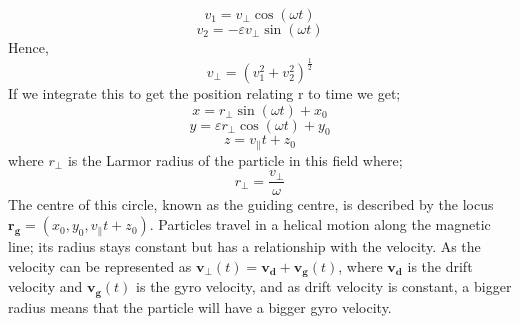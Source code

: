 \documentclass[14paper,11pt,hidelinks]{article}
\begin{document}
\begin{equation}
v_1=v_\bot \cos(\omega t)
\end{equation}
\begin{equation}
v_2=-\varepsilon v_\bot \sin(\omega t)
\end{equation}
Hence,
\begin{equation}
v_\bot=\left(v_1^2+v_2^2\right)^\frac{1}{2}
\end{equation}
If we integrate this to get the position relating r to time we get;
\begin{equation}
x=r_\bot \sin(\omega t)+x_0
\end{equation}
\begin{equation}
y=\varepsilon r_\bot \cos(\omega t)+y_0
\end{equation}
\begin{equation}
z=v_\parallel t+z_0
\end{equation}
where \begin{math} r_\bot \end{math} is the Larmor radius of the particle in this field where;
\begin{equation}
r_\bot=\frac{v_\bot}{\omega}
\end{equation}
The centre of this circle, known as the guiding centre, is described by the locus \begin{math} \mathbf{r_g}=(x_0,y_0,v_\parallel t+z_0) \end{math}.
Particles travel in a helical motion along the magnetic line; its radius stays constant but has a relationship with the velocity. As the velocity can be represented as \begin{math}\mathbf{v_\bot}(t)=\mathbf{v_d}+\mathbf{v_g}(t)\end{math}, where \begin{math}\mathbf{v_d}\end{math} is the drift velocity and \begin{math}\mathbf{v_g}(t)\end{math} is the gyro velocity, and as drift velocity is constant, a bigger radius means that the particle will have a bigger gyro velocity. 


\end{document}
